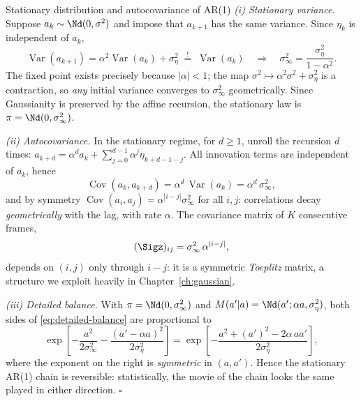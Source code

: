 \begin{toolbox}[tb:ar1]{Stationary distribution and autocovariance of AR(1)}
\emph{(i) Stationary variance.} Suppose $a_k \sim \Nd(0, \sigma^2)$ and
impose that $a_{k+1}$ has the same variance. Since $\eta_k$ is independent
of $a_k$,
\begin{equation*}
  \operatorname{Var}(a_{k+1})
  = \alpha^2 \operatorname{Var}(a_k) + \sigma_\eta^2
  \;\stackrel{!}{=}\; \operatorname{Var}(a_k)
  \quad\Longrightarrow\quad
  \sigma_\infty^2 = \frac{\sigma_\eta^2}{1 - \alpha^2}.
\end{equation*}
The fixed point exists precisely because $|\alpha| < 1$; the map
$\sigma^2 \mapsto \alpha^2 \sigma^2 + \sigma_\eta^2$ is a contraction, so
\emph{any} initial variance converges to $\sigma_\infty^2$ geometrically.
Since Gaussianity is preserved by the affine recursion, the stationary law
is $\pi = \Nd(0, \sigma_\infty^2)$.

\emph{(ii) Autocovariance.} In the stationary regime, for $d \geq 1$, unroll
the recursion $d$ times:
$a_{k+d} = \alpha^d a_k + \sum_{j=0}^{d-1} \alpha^{j} \eta_{k+d-1-j}$.
All innovation terms are independent of $a_k$, hence
\begin{equation*}
  \operatorname{Cov}(a_k, a_{k+d})
  = \alpha^d\, \operatorname{Var}(a_k)
  = \alpha^d\, \sigma_\infty^2 ,
\end{equation*}
and by symmetry $\operatorname{Cov}(a_i, a_j) = \alpha^{|i-j|}
\sigma_\infty^2$ for all $i, j$: correlations decay \emph{geometrically}
with the lag, with rate $\alpha$. The covariance matrix of $K$ consecutive
frames,
\begin{equation*}
  (\Sigz)_{ij} = \sigma_\infty^2\, \alpha^{|i-j|},
\end{equation*}
depends on $(i,j)$ only through $i - j$: it is a symmetric \emph{Toeplitz}
matrix, a structure we exploit heavily in Chapter~\ref{ch:gaussian}.

\emph{(iii) Detailed balance.} With $\pi = \Nd(0, \sigma_\infty^2)$ and
$M(a'|a) = \Nd(a'; \alpha a, \sigma_\eta^2)$, both sides of
\eqref{eq:detailed-balance} are proportional to
\begin{equation*}
  \exp\!\left[
    -\frac{a^2}{2\sigma_\infty^2}
    -\frac{(a' - \alpha a)^2}{2\sigma_\eta^2}
  \right]
  = \exp\!\left[
    -\frac{a^2 + (a')^2 - 2\alpha\, a a'}{2\sigma_\eta^2}
  \right],
\end{equation*}
where the exponent on the right is \emph{symmetric} in $(a, a')$. Hence the
stationary AR(1) chain is reversible: statistically, the movie of the chain
looks the same played in either direction. \hfill$\square$
\end{toolbox}

